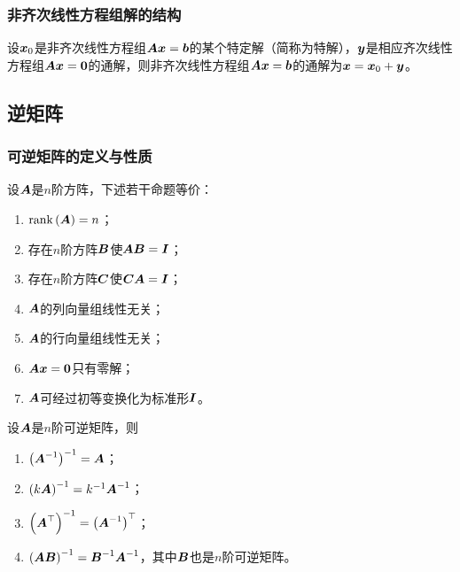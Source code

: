 \documentclass{ctexart}
\begin{document}
\subsubsection*{非齐次线性方程组解的结构}

\begin{theorem}
    设\(\boldsymbol{x}_0\)是非齐次线性方程组\(\boldsymbol{A}\boldsymbol{x}=\boldsymbol{b}\)的某个特定解（简称为特解），\(\boldsymbol{y}\)是相应齐次线性方程组\(\boldsymbol{A}\boldsymbol{x}=\boldsymbol{0}\)的通解，则非齐次线性方程组\(\boldsymbol{A}\boldsymbol{x}=\boldsymbol{b}\)的通解为\(\boldsymbol{x}=\boldsymbol{x}_0+\boldsymbol{y}\)。
\end{theorem}

\subsection{逆矩阵}

\subsubsection*{可逆矩阵的定义与性质}

\begin{theorem}
    设\(\boldsymbol{A}\)是\(n\)阶方阵，下述若干命题等价：
    \begin{enumerate}
        \item \(\mathrm{rank}\left( \boldsymbol{A} \right)=n\)；
        \item 存在\(n\)阶方阵\(\boldsymbol{B}\)使\(\boldsymbol{A}\boldsymbol{B}=\boldsymbol{I}\)；
        \item 存在\(n\)阶方阵\(\boldsymbol{C}\)使\(\boldsymbol{C}\boldsymbol{A}=\boldsymbol{I}\)；
        \item \(\boldsymbol{A}\)的列向量组线性无关；
        \item \(\boldsymbol{A}\)的行向量组线性无关；
        \item \(\boldsymbol{A}\boldsymbol{x}=\boldsymbol{0}\)只有零解；
        \item \(\boldsymbol{A}\)可经过初等变换化为标准形\(\boldsymbol{I}\)。
    \end{enumerate}
\end{theorem}

\begin{property}
    设\(\boldsymbol{A}\)是\(n\)阶可逆矩阵，则
    \begin{enumerate}
        \item \({\left( {\boldsymbol{A}}^{-1} \right)}^{-1}=\boldsymbol{A}\)；
        \item \({\left( k\boldsymbol{A} \right)}^{-1}={k}^{-1}{\boldsymbol{A}}^{-1}\)；
        \item \({\left( \boldsymbol{A}^\top \right)}^{-1}=\left( {\boldsymbol{A}}^{-1} \right)^\top\)；
        \item \({\left( \boldsymbol{A}\boldsymbol{B} \right)}^{-1}={\boldsymbol{B}}^{-1}{\boldsymbol{A}}^{-1}\)，其中\(\boldsymbol{B}\)也是\(n\)阶可逆矩阵。
    \end{enumerate}
\end{property}
\end{document}
